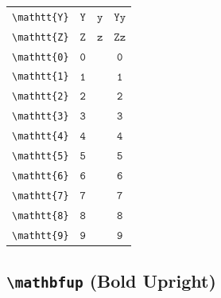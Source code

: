 \documentclass[12pt,a4paper]{article}
\begin{document}
\begin{longtable}{|c|c|c|c|}
\verb|\mathtt{Y}| & $\mathtt{Y}$ & $\mathtt{y}$ & $ 𝚈 𝚢 $ \\
\verb|\mathtt{Z}| & $\mathtt{Z}$ & $\mathtt{z}$ & $ 𝚉 𝚣 $ \\
\verb|\mathtt{0}| & $\mathtt{0}$ & & $ 𝟶 $ \\
\verb|\mathtt{1}| & $\mathtt{1}$ & & $ 𝟷 $ \\
\verb|\mathtt{2}| & $\mathtt{2}$ & & $ 𝟸 $ \\
\verb|\mathtt{3}| & $\mathtt{3}$ & & $ 𝟹 $ \\
\verb|\mathtt{4}| & $\mathtt{4}$ & & $ 𝟺 $ \\
\verb|\mathtt{5}| & $\mathtt{5}$ & & $ 𝟻 $ \\
\verb|\mathtt{6}| & $\mathtt{6}$ & & $ 𝟼 $ \\
\verb|\mathtt{7}| & $\mathtt{7}$ & & $ 𝟽 $ \\
\verb|\mathtt{8}| & $\mathtt{8}$ & & $ 𝟾 $ \\
\verb|\mathtt{9}| & $\mathtt{9}$ & & $ 𝟿 $ \\
\hline
\end{longtable}

\newpage

\subsection*{\texttt{\textbackslash{}mathbfup} (Bold Upright)}
\end{document}

